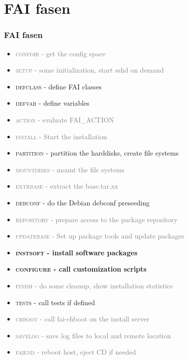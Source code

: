 \documentclass{beamer}
\newcommand{\light}[1]{\textcolor{gray}{#1}}
\begin{document}
\section{FAI fasen}
\begin{frame}
\frametitle{FAI fasen}
\begin{itemize}
  \item \light{\textsc{confdir} - get the config space}
  \item \light{\textsc{setup}                 - some initialization, start sshd on demand}
  \item \textsc{defclass}              - define FAI classes
  \item \textsc{defvar}                - define variables
  \item \light{\textsc{action}                - evaluate FAI\_ACTION}
  \item \light{\textsc{install}               - Start the installation}
  \item \textsc{partition}             - partition the harddisks, create file systems
  \item \light{\textsc{mountdisks}            - mount the file systems}
  \item \light{\textsc{extrbase}              - extract the base.tar.xz}
  \item \textsc{debconf}               - do the Debian debconf preseeding
  \item \light{\textsc{repository}            - prepare access to the package repository}
  \item \light{\textsc{updatebase}            - Set up package tools and update packages}
  \item \textbf{\textsc{instsoft}              - install software packages}
  \item \textbf{\textsc{configure}             - call customization scripts}
  \item \light{\textsc{finish}                - do some cleanup, show installation statistics}
  \item \textsc{tests}                 - call tests if defined
  \item \light{\textsc{chboot}                - call fai-chboot on the install server}
  \item \light{\textsc{savelog}               - save log files to local and remote location}
  \item \light{\textsc{faiend}                - reboot host, eject CD if needed}
\end{itemize}
\end{frame}
\end{document}
